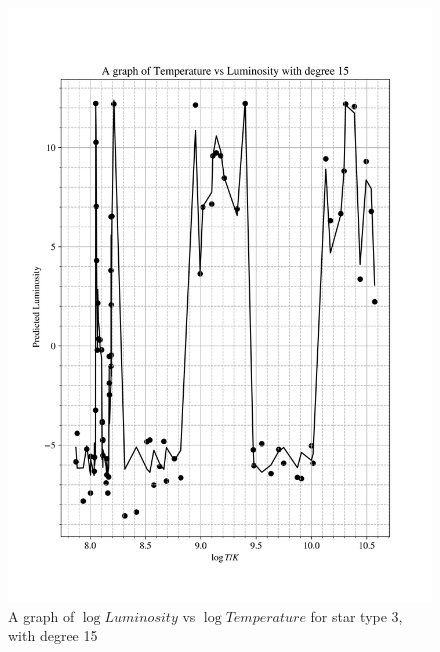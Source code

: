 \documentclass[12pt, a4paper]{article}
\begin{document}
\begin{figure}[H]
    \centering
    \includegraphics[width = \textwidth]{2Plot4_15.png}
    \caption{A graph of \(\log{Luminosity}\) vs \(\log{Temperature}\) for star type 3, with degree 15}
\end{figure}
\end{document}
